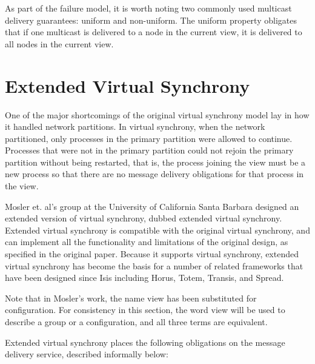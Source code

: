 As part of the failure model, it is worth noting two commonly used multicast
delivery guarantees: uniform and non-uniform. The uniform property obligates that
if one multicast is delivered to a node in the current view, it is delivered to
all nodes in the current view.

\section{Extended Virtual Synchrony}

One of the major shortcomings of the original virtual synchrony model lay in
how it handled network partitions. In virtual synchrony, when the network
partitioned, only processes in the primary partition were allowed to continue.
Processes that were not in the primary partition could not rejoin the primary
partition without being restarted, that is, the process joining the view must
be a new process so that there are no message delivery obligations for that
process in the view.

Mosler et. al's group at the University of California Santa Barbara designed
an extended version of virtual synchrony, dubbed extended virtual synchrony.
Extended virtual synchrony is compatible with the original virtual synchrony,
and can implement all the functionality and limitations of the original design,
as specified in the original paper. Because it supports virtual synchrony,
extended virtual synchrony has become the basis for a number of related
frameworks that have been designed since Isis including Horus, Totem, Transis,
and Spread.

Note that in Mosler's work, the name view has been substituted for configuration.
For consistency in this section, the word view will be used to describe a group
or a configuration, and all three terms are equivalent.

Extended virtual synchrony places the following obligations on the message
delivery service, described informally below:

